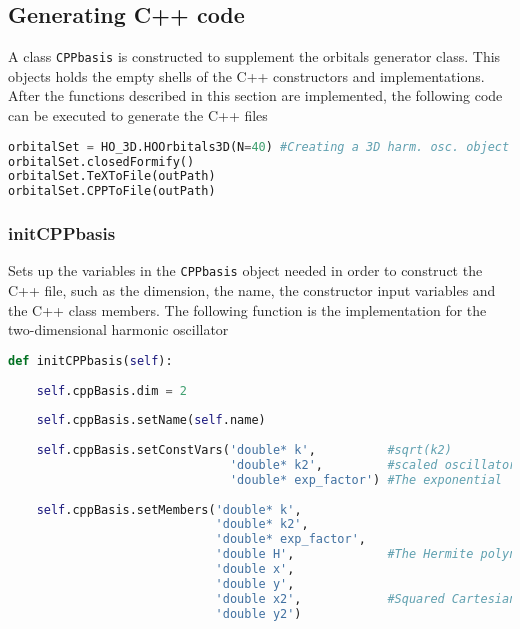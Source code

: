 \subsection{Generating C++ code}

A class \verb+CPPbasis+ is constructed to supplement the orbitals generator class. This objects holds the empty shells of the C++ constructors and implementations. After the functions described in this section are implemented, the following code can be executed to generate the C++ files

\vspace{0.25cm}
\begin{lstlisting}[language=Python]
orbitalSet = HO_3D.HOOrbitals3D(N=40) #Creating a 3D harm. osc. object
orbitalSet.closedFormify() 
orbitalSet.TeXToFile(outPath)
orbitalSet.CPPToFile(outPath)
\end{lstlisting}


\subsubsection{initCPPbasis}

Sets up the variables in the \verb+CPPbasis+ object needed in order to construct the C++ file, such as the dimension, the name, the constructor input variables and the C++ class members. The following function is the implementation for the two-dimensional harmonic oscillator

\vspace{0.25cm}
\begin{lstlisting}[language=Python, otherkeywords={self}]
def initCPPbasis(self):
    
    self.cppBasis.dim = 2
    
    self.cppBasis.setName(self.name)
    
    self.cppBasis.setConstVars('double* k',          #sqrt(k2)
                               'double* k2',         #scaled oscillator freq.
                               'double* exp_factor') #The exponential
                               
    self.cppBasis.setMembers('double* k', 
                             'double* k2',         
                             'double* exp_factor',  
                             'double H',             #The Hermite polynomial part
                             'double x',
                             'double y',
                             'double x2',            #Squared Cartesian coordinates
                             'double y2') 
\end{lstlisting}

